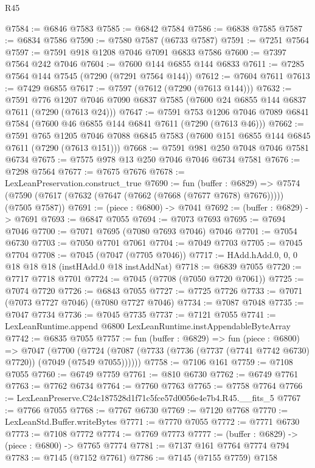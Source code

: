 \begin{lexlean}{R45}
\begin{coremodule}
{@7584 := @6846 @7583
@7585 := @6842 @7584
@7586 := @6838 @7585
@7587 := @6834 @7586
@7590 := @7580 @7587 (@6733 @7587)
@7591 := @7251 @7564
@7597 := @7591 @918 @1208 @7046 @7091 @6833 @7586
@7600 := @7397 @7564 @242 @7046
@7604 := @7600 @144 @6855 @144 @6833
@7611 := @7285 @7564 @144 @7545 (@7290 (@7291 @7564 @144))
@7612 := @7604 @7611
@7613 := @7429 @6855
@7617 := @7597 (@7612 (@7290 (@7613 @144)))
@7632 := @7591
    @776
    @1207
    @7046
    @7090
    @6837
    @7585
    (@7600 @24 @6855 @144 @6837 @7611 (@7290 (@7613 @24)))
@7647 := @7591
    @753
    @1206
    @7046
    @7089
    @6841
    @7584
    (@7600 @46 @6855 @144 @6841 @7611 (@7290 (@7613 @46)))
@7662 := @7591
    @765
    @1205
    @7046
    @7088
    @6845
    @7583
    (@7600 @151 @6855 @144 @6845 @7611 (@7290 (@7613 @151)))
@7668 := @7591 @981 @250 @7048 @7046 @7581 @6734
@7675 := @7575 @978 @13 @250 @7046 @7046 @6734 @7581
@7676 := @7298 @7564
@7677 := @7675 @7676
@7678 := LexLeanPreservation.construct_true
@7690 := fun (buffer : @6829) =>
  @7574 (@7590 (@7617 (@7632 (@7647 (@7662 (@7668 (@7677 @7678) @7676))))) (@7505 @7587))
@7691 := (piece : @6800) -> @7041
@7692 := (buffer : @6829) -> @7691
@7693 := @6847 @7055
@7694 := @7073 @7693
@7695 := @7694 @7046
@7700 := @7071 @7695 (@7080 @7693 @7046) @7046
@7701 := @7054 @6730
@7703 := @7050 @7701 @7061
@7704 := @7049 @7703
@7705 := @7045 @7704
@7708 := @7045 (@7047 (@7705 @7046))
@7717 := HAdd.hAdd.{0, 0, 0} @18 @18 @18 (instHAdd.{0} @18 instAddNat)
@7718 := @6839 @7055
@7720 := @7717 @7718 @7701
@7724 := @7045 (@7708 (@7050 @7720 @7061))
@7725 := @7074 @7720
@7726 := @6843 @7055
@7727 := @7725 @7726
@7733 := @7071 (@7073 @7727 @7046) (@7080 @7727 @7046)
@7734 := @7087 @7048
@7735 := @7047 @7734
@7736 := @7045 @7735
@7737 := @7121 @7055
@7741 := LexLeanRuntime.append @6800 LexLeanRuntime.instAppendableByteArray
@7742 := @6835 @7055
@7757 := fun (buffer : @6829) =>
  fun (piece : @6800) =>
  @7047
    (@7700 (@7724 (@7087 (@7733 (@7736 (@7737 (@7741 @7742 @6730) @7720)) (@7049 (@7549 @7055))))))
@7758 := @7106 @161
@7759 := @7108 @7055
@7760 := @6749 @7759
@7761 := @810 @6730
@7762 := @6749 @7761
@7763 := @7762 @6734
@7764 := @7760 @7763
@7765 := @7758 @7764
@7766 := LexLeanPreserve.C24c187528d1f71c5fce57d0056e4e7b4.R45.__fits_5
@7767 := @7766 @7055
@7768 := @7767 @6730
@7769 := @7120 @7768
@7770 := LexLeanStd.Buffer.writeBytes
@7771 := @7770 @7055
@7772 := @7771 @6730
@7773 := @7108 @7772
@7774 := @7769 @7773
@7777 := (buffer : @6829) -> (piece : @6800) -> @7765 @7774
@7781 := @7137 @161 @7764 @7774 @794
@7783 := @7145 (@7152 @7761)
@7786 := @7145 (@7155 @7759) @7158
}
\end{coremodule}
\end{lexlean}
